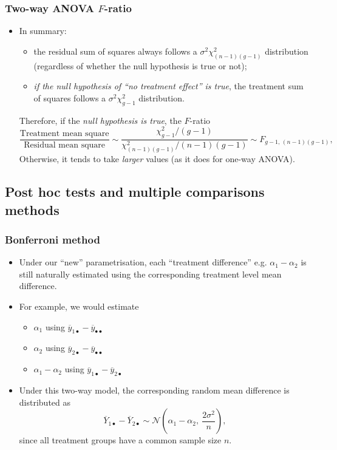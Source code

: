 \documentclass[a4paper]{article}\usepackage[]{graphicx}\usepackage[]{xcolor}
\begin{document}
\subsubsection{Two-way ANOVA \( F \)-ratio}
\begin{itemize}
	\item In summary:
	\begin{itemize}
		\item the residual sum of squares always follows a \( \sigma^2\chi^2_{(n-1)(g-1)} \) distribution (regardless of whether the null hypothesis is true or not);
		\item \textit{if the null hypothesis of ``no treatment effect'' is true}, the treatment sum of squares follows a \( \sigma^2\chi^2_{g-1} \) distribution.
	\end{itemize}
	Therefore, if the \textit{null hypothesis is true}, the \( F \)-ratio
	\[
		\frac{\text{Treatment mean square}}{\text{Residual mean square}} \sim \frac{\chi^2_{g-1}/(g-1)}{\chi^2_{(n-1)(g-1)}/(n-1)(g-1)}\sim F_{g-1,\,(n-1)(g-1)},
	\]
	Otherwise, it tends to take \textit{larger} values (as it does for one-way ANOVA).
\end{itemize}
\subsection{Post hoc tests and multiple comparisons methods}
\subsubsection{Bonferroni method}
\begin{itemize}
	\item Under our ``new'' parametrisation, each ``treatment difference'' e.g. \( \alpha_1 - \alpha_2 \) is still naturally estimated using the corresponding treatment level mean difference.
	\item For example, we would estimate
	\begin{itemize}
		\item \( \alpha_1 \) using \( \overline{y}_{1\bullet} - \overline{y}_{\bullet\bullet} \) 
		\item \( \alpha_2 \) using \( \overline{y}_{2\bullet} - \overline{y}_{\bullet\bullet} \) 
		\item \( \alpha_1 - \alpha_2 \) using \( \overline{y}_{1\bullet} - \overline{y}_{2\bullet} \) 
	\end{itemize}
	\item Under this two-way model, the corresponding random mean difference is distributed as
	\[
		\overline Y_{1\bullet}-\overline Y_{2\bullet}\sim \mathcal{N}\left( \alpha_1-\alpha_2,\ \frac{2\sigma^2}{n} \right),
	\]
	since all treatment groups have a common sample size \( n \).
\end{itemize}
\end{document}
